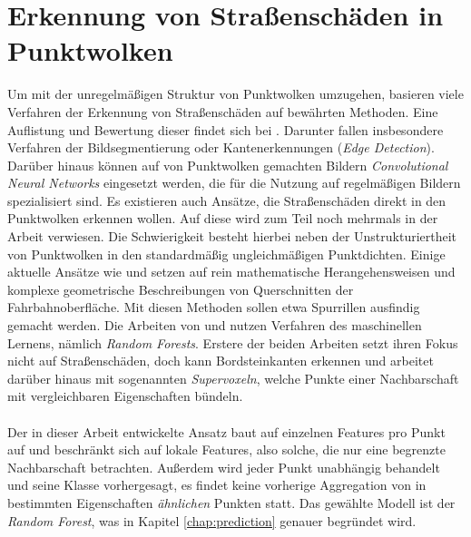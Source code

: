 \section{Erkennung von Straßenschäden in Punktwolken}

Um mit der unregelmäßigen Struktur von Punktwolken umzugehen, basieren viele Verfahren der Erkennung von Straßenschäden auf bewährten Methoden. Eine Auflistung und Bewertung dieser findet sich bei \cite{Wenming.etal-2020}. Darunter fallen insbesondere Verfahren der Bildsegmentierung oder Kantenerkennungen (\textit{Edge Detection}). Darüber hinaus können auf von Punktwolken gemachten Bildern \textit{Convolutional Neural Networks} eingesetzt werden, die für die Nutzung auf regelmäßigen Bildern spezialisiert sind. Es existieren auch Ansätze, die Straßenschäden direkt in den Punktwolken erkennen wollen. Auf diese wird zum Teil noch mehrmals in der Arbeit verwiesen. Die Schwierigkeit besteht hierbei neben der Unstrukturiertheit von Punktwolken in den standardmäßig ungleichmäßigen Punktdichten. Einige aktuelle Ansätze wie \cite{Famili.etal-2021} und \cite{Gezero.Antunes-2019} setzen auf rein mathematische Herangehensweisen und komplexe geometrische Beschreibungen von Querschnitten der Fahrbahnoberfläche. Mit diesen Methoden sollen etwa Spurrillen ausfindig gemacht werden. Die Arbeiten von \cite{Li.Cheng-2018} und \cite{Zhiqiang.etal-2019} nutzen Verfahren des maschinellen Lernens, nämlich \textit{Random Forests}. Erstere der beiden Arbeiten setzt ihren Fokus nicht auf Straßenschäden, doch kann Bordsteinkanten erkennen und arbeitet darüber hinaus mit sogenannten \textit{Supervoxeln}, welche Punkte einer Nachbarschaft mit vergleichbaren Eigenschaften bündeln. \\\\
Der in dieser Arbeit entwickelte Ansatz baut auf einzelnen Features pro Punkt auf und beschränkt sich auf lokale Features, also solche, die nur eine begrenzte Nachbarschaft betrachten. Außerdem wird jeder Punkt unabhängig behandelt und seine Klasse vorhergesagt, es findet keine vorherige Aggregation von in bestimmten Eigenschaften \textit{ähnlichen} Punkten statt. Das gewählte Modell ist der \textit{Random Forest}, was in Kapitel \ref{chap:prediction} genauer begründet wird.